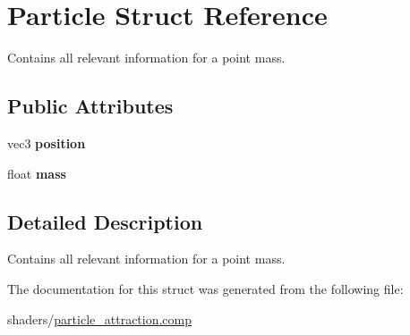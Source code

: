\hypertarget{struct_particle}{}\section{Particle Struct Reference}
\label{struct_particle}


Contains all relevant information for a point mass.  


\subsection*{Public Attributes}
\begin{DoxyCompactItemize}
\item 
\mbox{\label{struct_particle_a298aa6942260fd7ecda49584a81c681c}} 
vec3 {\bfseries position}
\item 
\mbox{\label{struct_particle_a3c6ce7e289c672449533a714b5c22e75}} 
float {\bfseries mass}
\end{DoxyCompactItemize}


\subsection{Detailed Description}
Contains all relevant information for a point mass. 

The documentation for this struct was generated from the following file\+:\begin{DoxyCompactItemize}
\item 
shaders/\hyperlink{particle__attraction_8comp}{particle\+\_\+attraction.\+comp}\end{DoxyCompactItemize}
